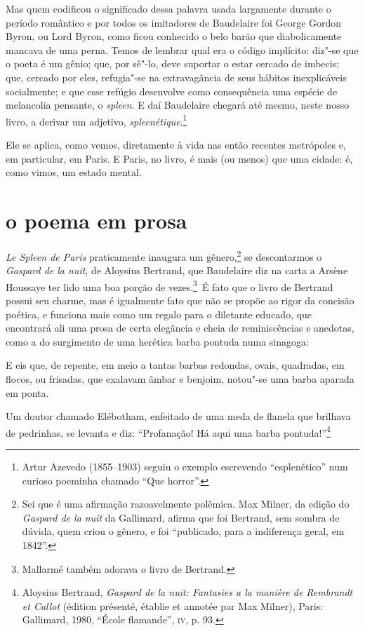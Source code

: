 Mas quem codificou o significado dessa palavra usada largamente durante
o período romântico e por todos os imitadores de Baudelaire foi George
Gordon Byron, ou Lord Byron, como ficou conhecido o belo barão que
diabolicamente mancava de uma perna. Temos de lembrar qual era o código
implícito: diz"-se que o poeta é um gênio; que, por sê"-lo, deve
suportar o estar cercado de imbecis; que, cercado por eles,
refugia"-se na extravagância de seus hábitos inexplicáveis
socialmente; e que esse refúgio desenvolve como consequência uma
espécie de melancolia pensante, o \textit{spleen}. E daí 
Baudelaire chegará até mesmo, neste nosso livro, a derivar um
adjetivo,\textit{ spleenétique}.\footnote{ Artur Azevedo
(1855--1903) seguiu o exemplo escrevendo “esplenético” num curioso
poeminha chamado “Que horror”.}

Ele se aplica, como vemos, diretamente à vida nas então recentes
metrópoles e, em particular, em Paris. E Paris, no livro, é mais (ou
menos) que uma cidade: é, como vimos, um estado mental.

\section*{o poema em prosa}
\textit{Le Spleen de Paris} praticamente inaugura um gênero,\footnote{
Sei que é uma afirmação razoavelmente polêmica. Max Milner, da edição
do \textit{Gaspard de la nuit} da Gallimard, afirma que foi Bertrand, sem sombra
de dúvida, quem criou o gênero, e foi “publicado, para a indiferença
geral, em 1842”.} se descontarmos o \textit{Gaspard de la nuit}, de
Aloysius Bertrand, que Baudelaire diz na carta a Arsène Houssaye ter
lido uma boa porção de vezes.\footnote{ Mallarmé também adorava o livro
de Bertrand.}~É fato que o livro de Bertrand possui seu charme, mas é
igualmente fato que não se propõe ao rigor da concisão poética, e
funciona mais como um regalo para o diletante educado, que encontrará
ali uma prosa de certa elegância e cheia de reminiscências e anedotas,
como a do surgimento de uma herética barba pontuda numa sinagoga:

\begin{hedraquote}
E eis que, de repente, em meio a tantas barbas redondas, ovais,
quadradas, em flocos, ou frisadas, que exalavam âmbar e benjoim,
notou"-se uma barba aparada em ponta.

Um doutor chamado Elébotham, enfeitado de uma meda de flanela que
brilhava de pedrinhas, se levanta e diz: “Profanação! Há aqui uma barba
pontuda!”\footnote{ Aloysius Bertrand, \textit{Gaspard de la nuit: Fantasies a
la manière de Rembrandt et Callot} (édition présenté, établie et annotée
par Max Milner), Paris: Gallimard, 1980, “École flamande”, \textsc{iv}, p. 93.}
\end{hedraquote}

